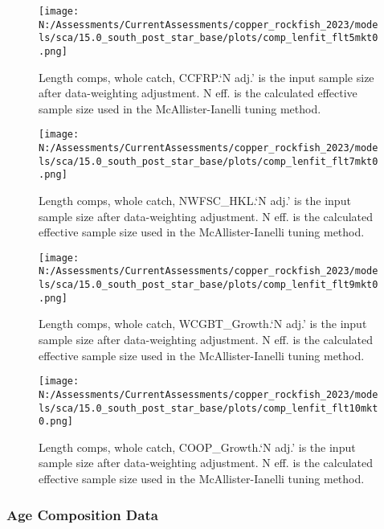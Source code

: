 \documentclass[11pt,
  english,
  letterpaper,
]{article}
\begin{document}
\begin{figure}
\centering
\texttt{[image: N:/Assessments/CurrentAssessments/copper\_rockfish\_2023/models/sca/15.0\_south\_post\_star\_base/plots/comp\_lenfit\_flt5mkt0.png]}
\caption{Length comps, whole catch, CCFRP.`N adj.' is the input sample size after data-weighting adjustment. N eff. is the calculated effective sample size used in the McAllister-Ianelli tuning method.\label{fig:comp_lenfit_flt5mkt0}}
\end{figure}

\begin{figure}
\centering
\texttt{[image: N:/Assessments/CurrentAssessments/copper\_rockfish\_2023/models/sca/15.0\_south\_post\_star\_base/plots/comp\_lenfit\_flt7mkt0.png]}
\caption{Length comps, whole catch, NWFSC\_HKL.`N adj.' is the input sample size after data-weighting adjustment. N eff. is the calculated effective sample size used in the McAllister-Ianelli tuning method.\label{fig:comp_lenfit_flt7mkt0}}
\end{figure}

\begin{figure}
\centering
\texttt{[image: N:/Assessments/CurrentAssessments/copper\_rockfish\_2023/models/sca/15.0\_south\_post\_star\_base/plots/comp\_lenfit\_flt9mkt0.png]}
\caption{Length comps, whole catch, WCGBT\_Growth.`N adj.' is the input sample size after data-weighting adjustment. N eff. is the calculated effective sample size used in the McAllister-Ianelli tuning method.\label{fig:comp_lenfit_flt9mkt0}}
\end{figure}

\begin{figure}
\centering
\texttt{[image: N:/Assessments/CurrentAssessments/copper\_rockfish\_2023/models/sca/15.0\_south\_post\_star\_base/plots/comp\_lenfit\_flt10mkt0.png]}
\caption{Length comps, whole catch, COOP\_Growth.`N adj.' is the input sample size after data-weighting adjustment. N eff. is the calculated effective sample size used in the McAllister-Ianelli tuning method.\label{fig:comp_lenfit_flt10mkt0}}
\end{figure}

\newpage

\hypertarget{age-data}{%
\subsubsection{Age Composition Data}\label{age-data}}
\end{document}
